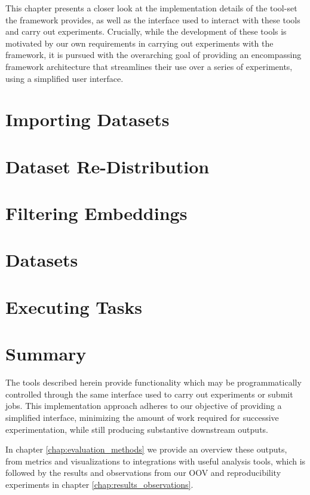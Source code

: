 \documentclass[../../fyp.tex]{subfiles}
\begin{document}
 
This chapter presents a closer look at the implementation details of the tool-set the framework provides, as well as the interface used to interact with these tools and carry out experiments. Crucially, while the development of these tools is motivated by our own requirements in carrying out experiments with the framework, it is pursued with the overarching goal of providing an encompassing framework architecture that streamlines their use over a series of experiments, using a simplified user interface. 

\section{Importing Datasets} \label{sec:importing_datasets}


\section{Dataset Re-Distribution} \label{sec:dataset_redist}


\section{Filtering Embeddings} \label{sec:filtering_embeddings}


\section{Datasets} \label{sec:datasets}


\section{Executing Tasks} \label{sec:executing_tasks}


\section{Summary}
The tools described herein provide functionality which may be programmatically controlled through the same interface used to carry out experiments or submit jobs. This implementation approach adheres to our objective of providing a simplified interface, minimizing the amount of work required for successive experimentation, while still producing substantive downstream outputs. 

In chapter \ref{chap:evaluation_methods} we provide an overview these outputs, from metrics and visualizations to integrations with useful analysis tools, which is followed by the results and observations from our OOV and reproducibility experiments in chapter \ref{chap:results_observations}.
\end{document}
